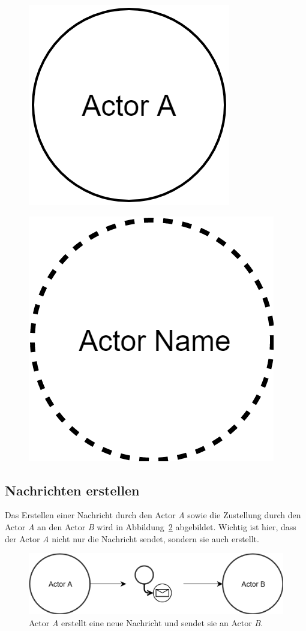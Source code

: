 \begin{figure}
  \centering
  \begin{minipage}{.5\textwidth}
   \centering 
   \includegraphics[width=.5\linewidth]{gfx/actor/longLiveActor}
   \label{fig:actor:diagram:longLiveActor}
  \end{minipage}%
  \begin{minipage}{.5\textwidth}
   \centering
   \includegraphics[width=.5\linewidth]{gfx/actor/shortLiveActor}
   \label{fig:actor:diagram:shortLiveActor}
  \end{minipage}
\end{figure} 

\subsection{Nachrichten erstellen}
Das Erstellen einer Nachricht durch den Actor \textit{A} sowie die Zustellung durch den Actor \textit{A} an den Actor \textit{B} wird in Abbildung~\ref{fig:actor:diagram:simpleCreateAndSendMessage} abgebildet. Wichtig ist hier, dass der Actor \textit{A} nicht nur die Nachricht sendet, sondern sie auch erstellt.
\begin{figure}
  \centering
  \includegraphics[width=\linewidth]{gfx/actor/simpleCreateAndSendMessage}
  \caption{Actor \textit{A} erstellt eine neue Nachricht und sendet sie an Actor \textit{B}.}
  \label{fig:actor:diagram:simpleCreateAndSendMessage}
\end{figure}

